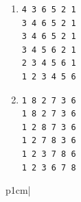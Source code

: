 \begin{answer}
\begin{enumerate}
\item 
\begin{verbatim}
4 3 6 5 2 1
3 4 6 5 2 1
3 4 6 5 2 1
3 4 5 6 2 1
2 3 4 5 6 1
1 2 3 4 5 6
\end{verbatim}

\item 
\begin{verbatim}
1 8 2 7 3 6
1 8 2 7 3 6
1 2 8 7 3 6
1 2 7 8 3 6
1 2 3 7 8 6
1 2 3 6 7 8
\end{verbatim}
\end{enumerate}
\end{answer}
p{1cm}|